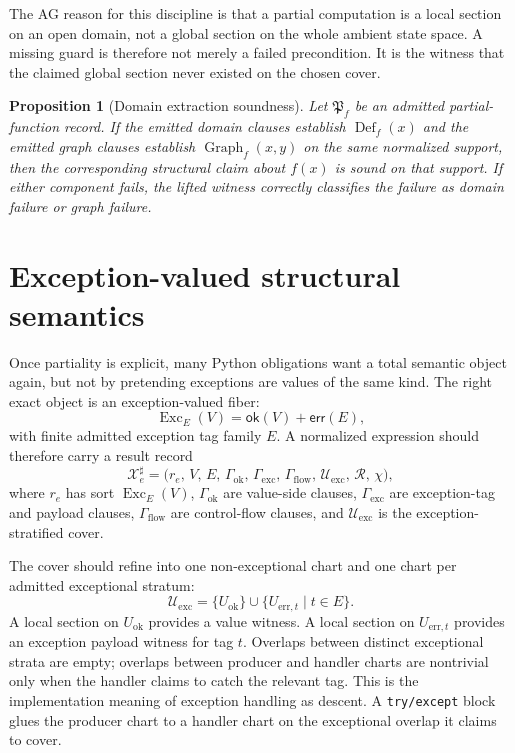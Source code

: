 \documentclass[11pt]{report}
\newtheorem{proposition}[definition]{Proposition}
\begin{document}
The AG reason for this discipline is that a partial computation is a local section on an open domain, not a global section on the whole ambient state space. A missing guard is therefore not merely a failed precondition. It is the witness that the claimed global section never existed on the chosen cover.

\begin{proposition}[Domain extraction soundness]
Let $\mathfrak{P}_{f}$ be an admitted partial-function record. If the emitted domain clauses establish $\operatorname{Def}_{f}(x)$ and the emitted graph clauses establish $\operatorname{Graph}_{f}(x,y)$ on the same normalized support, then the corresponding structural claim about $f(x)$ is sound on that support. If either component fails, the lifted witness correctly classifies the failure as domain failure or graph failure.
\end{proposition}

\section{Exception-valued structural semantics}
Once partiality is explicit, many Python obligations want a total semantic object again, but not by pretending exceptions are values of the same kind. The right exact object is an exception-valued fiber:
\[
\operatorname{Exc}_{E}(V) = \mathsf{ok}(V) + \mathsf{err}(E),
\]
with finite admitted exception tag family $E$. A normalized expression should therefore carry a result record
\[
\mathcal{X}^{\sharp}_{e}
=
\bigl(
r_e,\,
V,\,
E,\,
\Gamma_{\mathrm{ok}},\,
\Gamma_{\mathrm{exc}},\,
\Gamma_{\mathrm{flow}},\,
\mathcal{U}_{\mathrm{exc}},\,
\mathcal{R},\,
\chi
\bigr),
\]
where $r_e$ has sort $\operatorname{Exc}_{E}(V)$, $\Gamma_{\mathrm{ok}}$ are value-side clauses, $\Gamma_{\mathrm{exc}}$ are exception-tag and payload clauses, $\Gamma_{\mathrm{flow}}$ are control-flow clauses, and $\mathcal{U}_{\mathrm{exc}}$ is the exception-stratified cover.

The cover should refine into one non-exceptional chart and one chart per admitted exceptional stratum:
\[
\mathcal{U}_{\mathrm{exc}}
=
\{U_{\mathrm{ok}}\}\cup\{U_{\mathrm{err},t}\mid t\in E\}.
\]
A local section on $U_{\mathrm{ok}}$ provides a value witness. A local section on $U_{\mathrm{err},t}$ provides an exception payload witness for tag $t$. Overlaps between distinct exceptional strata are empty; overlaps between producer and handler charts are nontrivial only when the handler claims to catch the relevant tag. This is the implementation meaning of exception handling as descent. A \texttt{try/except} block glues the producer chart to a handler chart on the exceptional overlap it claims to cover.
\end{document}
